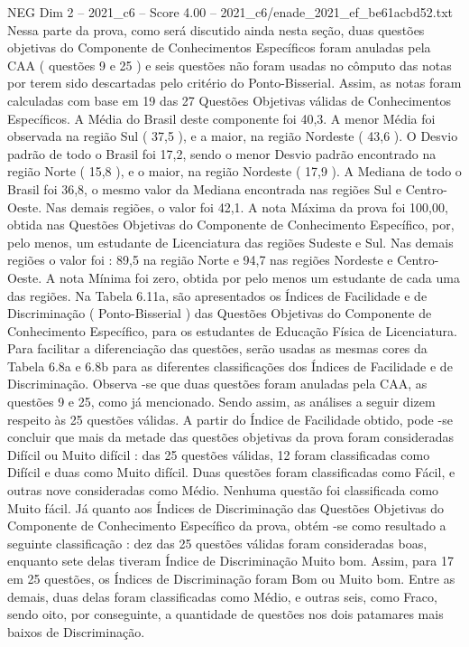 \begin{textsample}{NEG Dim 2 – 2021\_c6 – Score 4.00 – 2021\_c6/enade\_2021\_ef\_be61acbd52.txt}
Nessa parte da prova, como será discutido ainda nesta seção, duas questões objetivas do Componente de Conhecimentos Específicos foram anuladas pela CAA ( questões 9 e 25 ) e seis questões não foram usadas no cômputo das notas por terem sido descartadas pelo critério do Ponto-Bisserial.
Assim, as notas foram calculadas com base em 19 das 27 Questões Objetivas válidas de Conhecimentos Específicos.
A Média do Brasil deste componente foi 40,3.
A menor Média foi observada na região Sul ( 37,5 ), e a maior, na região Nordeste ( 43,6 ).
O Desvio padrão de todo o Brasil foi 17,2, sendo o menor Desvio padrão encontrado na região Norte ( 15,8 ), e o maior, na região Nordeste ( 17,9 ).
A Mediana de todo o Brasil foi 36,8, o mesmo valor da Mediana encontrada nas regiões Sul e Centro-Oeste.
Nas demais regiões, o valor foi 42,1.
A nota Máxima da prova foi 100,00, obtida nas Questões Objetivas do Componente de Conhecimento Específico, por, pelo menos, um estudante de Licenciatura das regiões Sudeste e Sul.
Nas demais regiões o valor foi : 89,5 na região Norte e 94,7 nas regiões Nordeste e Centro-Oeste.
A nota Mínima foi zero, obtida por pelo menos um estudante de cada uma das regiões.
Na Tabela 6.11a, são apresentados os Índices de Facilidade e de Discriminação ( Ponto-Bisserial ) das Questões Objetivas do Componente de Conhecimento Específico, para os estudantes de Educação Física de Licenciatura.
Para facilitar a diferenciação das questões, serão usadas as mesmas cores da Tabela 6.8a e 6.8b para as diferentes classificações dos Índices de Facilidade e de Discriminação.
Observa -se que duas questões foram anuladas pela CAA, as questões 9 e 25, como já mencionado.
Sendo assim, as análises a seguir dizem respeito às 25 questões válidas.
A partir do Índice de Facilidade obtido, pode -se concluir que mais da metade das questões objetivas da prova foram consideradas Difícil ou Muito difícil : das 25 questões válidas, 12 foram classificadas como Difícil e duas como Muito difícil.
Duas questões foram classificadas como Fácil, e outras nove consideradas como Médio.
Nenhuma questão foi classificada como Muito fácil.
Já quanto aos Índices de Discriminação das Questões Objetivas do Componente de Conhecimento Específico da prova, obtém -se como resultado a seguinte classificação : dez das 25 questões válidas foram consideradas boas, enquanto sete delas tiveram Índice de Discriminação Muito bom.
Assim, para 17 em 25 questões, os Índices de Discriminação foram Bom ou Muito bom.
Entre as demais, duas delas foram classificadas como Médio, e outras seis, como Fraco, sendo oito, por conseguinte, a quantidade de questões nos dois patamares mais baixos de Discriminação.

\end{textsample}
